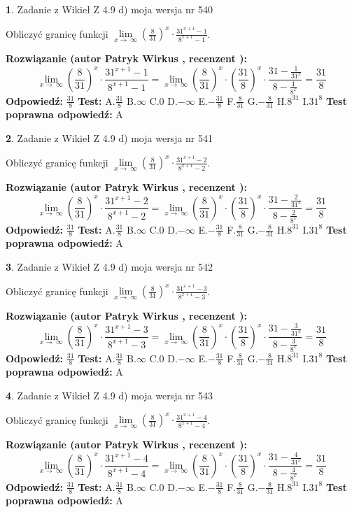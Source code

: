 \documentclass[12pt, a4paper]{article}
\theoremstyle{definition} %
\newtheorem{zad}{}
\newcommand{\zadStart}[1]{\begin{zad}#1\newline}
\newcommand{\zadStop}{\end{zad}}
\newcommand{\rozwStart}[2]{\noindent \textbf{Rozwiązanie (autor #1 , recenzent #2): }\newline}
\newcommand{\rozwStop}{\newline}
\newcommand{\odpStart}{\noindent \textbf{Odpowiedź:}\newline}
\newcommand{\odpStop}{\newline}
\newcommand{\testStart}{\noindent \textbf{Test:}\newline}
\newcommand{\testStop}{\newline}
\newcommand{\kluczStart}{\noindent \textbf{Test poprawna odpowiedź:}\newline}
\newcommand{\kluczStop}{\newline}
\begin{document}
\zadStart{Zadanie z Wikieł Z 4.9 d) moja wersja nr 540}


Obliczyć granicę funkcji  $\lim\limits_{x\to\ \infty}(\frac{8}{31})^{x}\cdot\frac{31^{x+1}-1}{8^{x+1}-1}$.
\zadStop
\rozwStart{Patryk Wirkus}{}
$$\lim\limits_{x\to\ \infty}(\frac{8}{31})^{x}\cdot\frac{31^{x+1}-1}{8^{x+1}-1}=\lim\limits_{x\to\ \infty}(\frac{8}{31})^{x}\cdot(\frac{31}{8})^{x} \cdot \frac{31-\frac{1}{31^{x}}}{8-\frac{1}{8^{x}}} = \frac{31}{8}$$
\rozwStop
\odpStart
$\frac{31}{8}$
\odpStop
\testStart
A.$\frac{31}{8}$ B.$\infty$ C.$0$ D.$-\infty$ E.$-\frac{31}{8}$
F.$\frac{8}{31}$ G.$-\frac{8}{31}$
H.$8^{31}$
I.$31^{8}$
\testStop
\kluczStart
A
\kluczStop



\zadStart{Zadanie z Wikieł Z 4.9 d) moja wersja nr 541}


Obliczyć granicę funkcji  $\lim\limits_{x\to\ \infty}(\frac{8}{31})^{x}\cdot\frac{31^{x+1}-2}{8^{x+1}-2}$.
\zadStop
\rozwStart{Patryk Wirkus}{}
$$\lim\limits_{x\to\ \infty}(\frac{8}{31})^{x}\cdot\frac{31^{x+1}-2}{8^{x+1}-2}=\lim\limits_{x\to\ \infty}(\frac{8}{31})^{x}\cdot(\frac{31}{8})^{x} \cdot \frac{31-\frac{2}{31^{x}}}{8-\frac{2}{8^{x}}} = \frac{31}{8}$$
\rozwStop
\odpStart
$\frac{31}{8}$
\odpStop
\testStart
A.$\frac{31}{8}$ B.$\infty$ C.$0$ D.$-\infty$ E.$-\frac{31}{8}$
F.$\frac{8}{31}$ G.$-\frac{8}{31}$
H.$8^{31}$
I.$31^{8}$
\testStop
\kluczStart
A
\kluczStop



\zadStart{Zadanie z Wikieł Z 4.9 d) moja wersja nr 542}


Obliczyć granicę funkcji  $\lim\limits_{x\to\ \infty}(\frac{8}{31})^{x}\cdot\frac{31^{x+1}-3}{8^{x+1}-3}$.
\zadStop
\rozwStart{Patryk Wirkus}{}
$$\lim\limits_{x\to\ \infty}(\frac{8}{31})^{x}\cdot\frac{31^{x+1}-3}{8^{x+1}-3}=\lim\limits_{x\to\ \infty}(\frac{8}{31})^{x}\cdot(\frac{31}{8})^{x} \cdot \frac{31-\frac{3}{31^{x}}}{8-\frac{3}{8^{x}}} = \frac{31}{8}$$
\rozwStop
\odpStart
$\frac{31}{8}$
\odpStop
\testStart
A.$\frac{31}{8}$ B.$\infty$ C.$0$ D.$-\infty$ E.$-\frac{31}{8}$
F.$\frac{8}{31}$ G.$-\frac{8}{31}$
H.$8^{31}$
I.$31^{8}$
\testStop
\kluczStart
A
\kluczStop



\zadStart{Zadanie z Wikieł Z 4.9 d) moja wersja nr 543}


Obliczyć granicę funkcji  $\lim\limits_{x\to\ \infty}(\frac{8}{31})^{x}\cdot\frac{31^{x+1}-4}{8^{x+1}-4}$.
\zadStop
\rozwStart{Patryk Wirkus}{}
$$\lim\limits_{x\to\ \infty}(\frac{8}{31})^{x}\cdot\frac{31^{x+1}-4}{8^{x+1}-4}=\lim\limits_{x\to\ \infty}(\frac{8}{31})^{x}\cdot(\frac{31}{8})^{x} \cdot \frac{31-\frac{4}{31^{x}}}{8-\frac{4}{8^{x}}} = \frac{31}{8}$$
\rozwStop
\odpStart
$\frac{31}{8}$
\odpStop
\testStart
A.$\frac{31}{8}$ B.$\infty$ C.$0$ D.$-\infty$ E.$-\frac{31}{8}$
F.$\frac{8}{31}$ G.$-\frac{8}{31}$
H.$8^{31}$
I.$31^{8}$
\testStop
\kluczStart
A
\kluczStop
\end{document}
